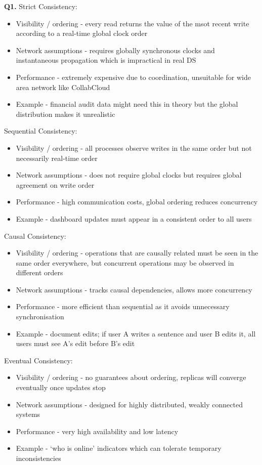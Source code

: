 \textbf{Q1.} Strict Consistency:
\begin{itemize}
    \item Visibility / ordering - every read returns the value of the msot recent write according to a real-time global clock order
    \item Network assumptions - requires globally synchronous clocks and instantaneous propagation which is impractical in real DS
    \item Performance - extremely expensive due to coordination, unsuitable for wide area network like CollabCloud
    \item Example - financial audit data might need this in theory but the global distribution makes it unrealistic
\end{itemize}

Sequential Consistency:
\begin{itemize}
    \item Visibility / ordering - all processes observe writes in the same order but not necessarily real-time order
    \item Network assumptions - does not require global clocks but requires global agreement on write order
    \item Performance - high communication costs, global ordering reduces concurrency
    \item Example - dashboard updates must appear in a consistent order to all users
\end{itemize}

Causal Consistency:
\begin{itemize}
    \item Visibility / ordering - operations that are causally related must be seen in the same order everywhere, but concurrent operations may be observed in different orders
    \item Network assumptions - tracks causal dependencies, allows more concurrency
    \item Performance - more efficient than sequential as it avoids unnecessary synchronisation
    \item Example - document edits; if user A writes a sentence and user B edits it, all users must see A's edit before B's edit
\end{itemize}

Eventual Consistency:
\begin{itemize}
    \item Visibility / ordering - no guarantees about ordering, replicas will converge eventually once updates stop
    \item Network assumptions - designed for highly distributed, weakly connected systems
    \item Performance - very high availability and low latency
    \item Example - `who is online' indicators which can tolerate temporary inconsistencies
\end{itemize}

